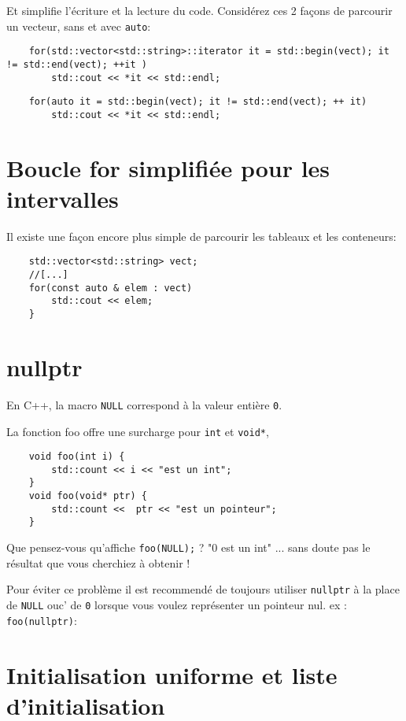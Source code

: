 \documentclass[8pt]{article}
\begin{document}
Et simplifie l'écriture et la lecture du code. Considérez ces 2 façons de parcourir un vecteur, sans et avec \lstinline{auto}:

\begin{lstlisting}
	for(std::vector<std::string>::iterator it = std::begin(vect); it != std::end(vect); ++it )
		std::cout << *it << std::endl;
\end{lstlisting}

\begin{lstlisting}
	for(auto it = std::begin(vect); it != std::end(vect); ++ it)
		std::cout << *it << std::endl;

\end{lstlisting}
		
\section*{Boucle for simplifiée pour les intervalles}
Il existe une façon encore plus simple de parcourir les tableaux et les conteneurs:

\begin{lstlisting}
	std::vector<std::string> vect;
	//[...]
	for(const auto & elem : vect)
		std::cout << elem;
    }
\end{lstlisting}
      
\section*{nullptr}     

En C++, la macro \lstinline{NULL} correspond à la valeur entière \lstinline{0}.

La fonction foo offre une surcharge pour \lstinline{int} et \lstinline{void*},
\begin{lstlisting}
	void foo(int i) {
		std::count << i << "est un int";
	}
	void foo(void* ptr) {
		std::count <<  ptr << "est un pointeur";
	}
\end{lstlisting}

Que pensez-vous qu'affiche \lstinline{foo(NULL);} ? "0 est un int" ... sans doute pas le résultat que vous cherchiez à obtenir !

Pour éviter ce problème il est recommendé de toujours utiliser \lstinline{nullptr} à la place de \lstinline{NULL} ouc' de \lstinline{0} lorsque vous voulez représenter un pointeur nul.  ex : \lstinline{foo(nullptr)}:


\section*{Initialisation uniforme et liste d’initialisation}
\end{document}
